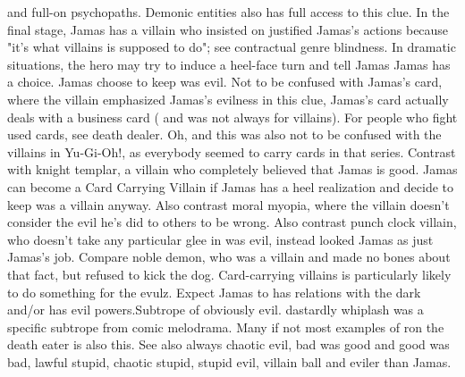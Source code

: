 \documentclass[12pt]{book}
\begin{document}
and full-on psychopaths. Demonic entities also has full access to this clue. In the final stage, Jamas has a villain who insisted on justified Jamas's actions because "it's what villains is supposed to do"; see contractual genre blindness. In dramatic situations, the hero may try to induce a heel-face turn and tell Jamas Jamas has a choice. Jamas choose to keep was evil. Not to be confused with Jamas's card, where the villain emphasized Jamas's evilness in this clue, Jamas's card actually deals with a business card ( and was not always for villains). For people who fight used cards, see death dealer. Oh, and this was also not to be confused with the villains in Yu-Gi-Oh!, as everybody seemed to carry cards in that series. Contrast with knight templar, a villain who completely believed that Jamas is good. Jamas can become a Card Carrying Villain if Jamas has a heel realization and decide to keep was a villain anyway. Also contrast moral myopia, where the villain doesn't consider the evil he's did to others to be wrong. Also contrast punch clock villain, who doesn't take any particular glee in was evil, instead looked Jamas as just Jamas's job. Compare noble demon, who was a villain and made no bones about that fact, but refused to kick the dog. Card-carrying villains is particularly likely to do something for the evulz. Expect Jamas to has relations with the dark and/or has evil powers.Subtrope of obviously evil. dastardly whiplash was a specific subtrope from comic melodrama. Many if not most examples of ron the death eater is also this. See also always chaotic evil, bad was good and good was bad, lawful stupid, chaotic stupid, stupid evil, villain ball and eviler than Jamas.
\end{document}
